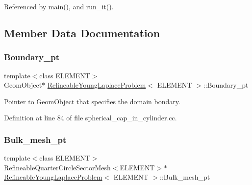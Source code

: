 Referenced by main(), and run\+\_\+it().



\subsection{Member Data Documentation}
\mbox{\label{classRefineableYoungLaplaceProblem_a6092f98c7ffbcd158c783d372d375759}} 
\subsubsection{\texorpdfstring{Boundary\+\_\+pt}{Boundary\_pt}}
{\footnotesize\ttfamily template$<$class E\+L\+E\+M\+E\+NT$>$ \\
Geom\+Object$\ast$ \hyperlink{classRefineableYoungLaplaceProblem}{Refineable\+Young\+Laplace\+Problem}$<$ E\+L\+E\+M\+E\+NT $>$\+::Boundary\+\_\+pt\hspace{0.3cm}{\ttfamily [private]}}



Pointer to Geom\+Object that specifies the domain bondary. 



Definition at line 84 of file spherical\+\_\+cap\+\_\+in\+\_\+cylinder.\+cc.

\mbox{\label{classRefineableYoungLaplaceProblem_ab036ff8d3bf66d3f3bb9e977bc6822d3}} 
\subsubsection{\texorpdfstring{Bulk\+\_\+mesh\+\_\+pt}{Bulk\_mesh\_pt}\hspace{0.1cm}{\footnotesize\ttfamily [1/2]}}
{\footnotesize\ttfamily template$<$class E\+L\+E\+M\+E\+NT$>$ \\
Refineable\+Quarter\+Circle\+Sector\+Mesh$<$E\+L\+E\+M\+E\+NT$>$$\ast$ \hyperlink{classRefineableYoungLaplaceProblem}{Refineable\+Young\+Laplace\+Problem}$<$ E\+L\+E\+M\+E\+NT $>$\+::Bulk\+\_\+mesh\+\_\+pt\hspace{0.3cm}{\ttfamily [private]}}



